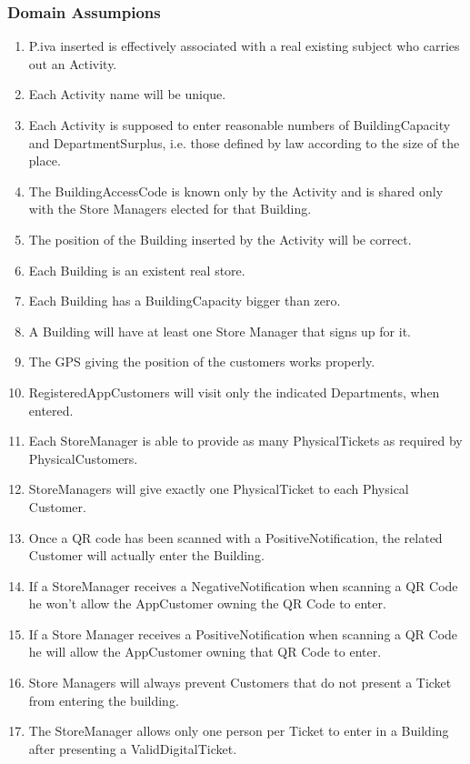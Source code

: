 \documentclass{article}
\begin{document}
	\subsubsection{Domain Assumpions}
	\renewcommand{\theenumi}{[D\,\arabic{enumi}]}
	\begin{enumerate}
		\item P.iva inserted is effectively associated with a real existing subject who carries out an Activity.
		\item Each Activity name will be unique.
		\item Each Activity is supposed to enter reasonable numbers of BuildingCapacity and DepartmentSurplus, i.e. those defined by law according to the size of the place.
		\item The BuildingAccessCode is known only by the Activity and is shared only with the Store Managers elected for that Building.
		\item The position of the Building inserted by the Activity will be correct.
		\item Each Building is an existent real store.
		\item Each Building has a BuildingCapacity bigger than zero.
		\item A Building will have at least one Store Manager that signs up for it.
		\item The GPS giving the position of the customers works properly.
		\item RegisteredAppCustomers will visit only the indicated Departments, when entered.
		\item Each StoreManager is able to provide as many PhysicalTickets as required by PhysicalCustomers.
		\item StoreManagers will give exactly one PhysicalTicket to each Physical Customer.
		\item Once a QR code has been scanned with a PositiveNotification, the related Customer will actually enter the Building.
		\item If a StoreManager receives a NegativeNotification when scanning a QR Code he won’t allow the AppCustomer owning the 		QR Code to enter.
		\item If a Store Manager receives a PositiveNotification when scanning a QR Code he will allow the AppCustomer owning that QR 		Code to enter.
		\item Store Managers will always prevent Customers that do not present a Ticket from entering the building.
		\item The StoreManager allows only one person per Ticket to	enter in a Building after presenting a ValidDigitalTicket.

\end{enumerate}
\end{document}
